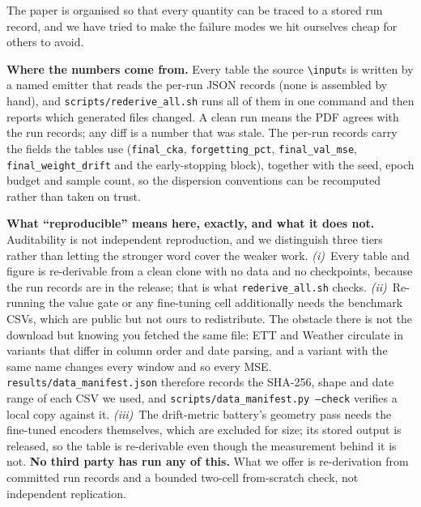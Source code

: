 The paper is organised so that every quantity can be traced to a stored run
record, and we have tried to make the failure modes we hit ourselves cheap for
others to avoid.

\textbf{Where the numbers come from.}  Every table the source
\texttt{\textbackslash input}s is written by a named emitter that reads the per-run
JSON records (none is assembled by hand), and
\texttt{scripts/rederive\_all.sh} runs all of them in one command and then reports
which generated files changed.  A clean run means the PDF agrees with the run
records; any diff is a number that was stale.  The per-run records carry the
fields the tables use (\texttt{final\_cka}, \texttt{forgetting\_pct},
\texttt{final\_val\_mse}, \texttt{final\_weight\_drift} and the early-stopping
block), together with the seed, epoch budget and sample count, so the dispersion
conventions can be recomputed rather than taken on trust.

\textbf{What ``reproducible'' means here, exactly, and what it does not.}
Auditability is not independent reproduction, and we distinguish three tiers
rather than letting the stronger word cover the weaker work.  \emph{(i)}~Every
table and figure is re-derivable from a clean clone with no data and no
checkpoints, because the run records are in the release; that is what
\texttt{rederive\_all.sh} checks.  \emph{(ii)}~Re-running the value gate or any
fine-tuning cell additionally needs the benchmark CSVs, which are public but not
ours to redistribute.  The obstacle there is not the download but knowing you
fetched the same file: ETT and Weather circulate in variants that differ in column
order and date parsing, and a variant with the same name changes every window and
so every MSE.  \texttt{results/data\_manifest.json} therefore records the
SHA-256, shape and date range of each CSV we used, and
\texttt{scripts/data\_manifest.py --check} verifies a local copy against it.
\emph{(iii)}~The drift-metric battery's geometry pass needs the fine-tuned
encoders themselves, which are excluded for size; its stored output is released,
so the table is re-derivable even though the measurement behind it is not.
\textbf{No third party has run any of this.}  What we offer is re-derivation from
committed run records and a bounded two-cell from-scratch check, not independent
replication.


